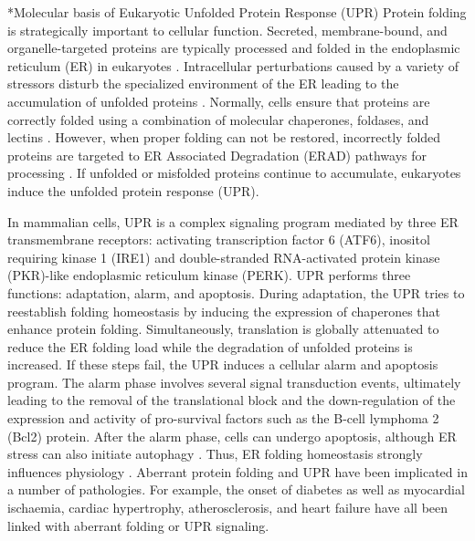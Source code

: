 \documentclass[12pt]{article}
\makeatletter
\renewcommand\section{\@startsection
	{subsection}{2}{0mm}
	{-0.2in}
	{0.05\baselineskip}
	{\normalfont\normalsize\bfseries}}
\makeatother
\begin{document}
\setcounter{page}{1}

\section*{Molecular basis of Eukaryotic Unfolded Protein Response (UPR)}
Protein folding is strategically important to cellular function. Secreted, membrane-bound, and organelle-targeted proteins are typically processed and folded in the endoplasmic reticulum (ER) in eukaryotes \citep{naidoo2009er,ron2002translational,kaufman2002unfolded}. Intracellular perturbations caused by a variety of stressors disturb the specialized environment of the ER leading to the accumulation of unfolded proteins \citep{ellgaard2003qce,Fonseca:2009fk}. Normally, cells ensure that proteins are correctly folded using a combination of molecular chaperones, foldases, and lectins \citep{naidoo2009er}. However, when proper folding can not be restored, incorrectly folded proteins are targeted to ER Associated Degradation (ERAD) pathways for processing \citep{kaufman2002unfolded}. If unfolded or misfolded proteins continue to accumulate, eukaryotes induce the unfolded protein response (UPR).

In mammalian cells, UPR is a complex signaling program mediated by three ER transmembrane receptors: activating transcription factor 6 (ATF6), inositol requiring kinase 1 (IRE1) and double-stranded RNA-activated protein kinase (PKR)-like endoplasmic reticulum kinase (PERK). UPR performs three functions: adaptation, alarm, and apoptosis. During adaptation, the UPR tries to reestablish folding homeostasis by inducing the expression of chaperones that enhance protein folding. Simultaneously, translation is globally attenuated to reduce the ER folding load while the degradation of unfolded proteins is increased. If these steps fail, the UPR induces a cellular alarm and apoptosis program. The alarm phase involves several signal transduction events, ultimately leading to the removal of the translational block and the down-regulation of the expression and activity of pro-survival factors such as the B-cell lymphoma 2 (Bcl2) protein. After the alarm phase, cells can undergo apoptosis, although ER stress can also initiate autophagy \citep{ogata2006aac,yorimitsu2006ers,bernales2006ace,kamimoto2006iic,hoyerhansen2007cmc,kouroku2006esp,fujita2007ter}. Thus, ER folding homeostasis strongly influences physiology \citep{Fonseca:2009fk}. Aberrant protein folding and UPR have been implicated in a number of pathologies. For example, the onset of diabetes \citep{schnell2009model} as well as myocardial ischaemia, cardiac hypertrophy, atherosclerosis, and heart failure \citep{glembotski2007ers} have all been linked with aberrant folding or UPR signaling. 
\end{document}
